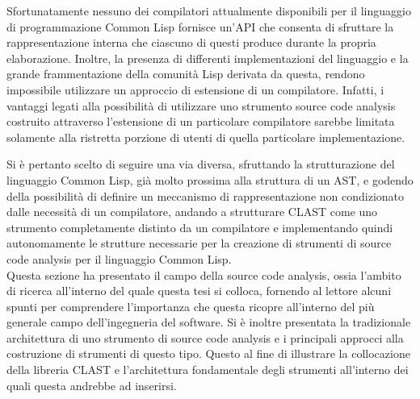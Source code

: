 Sfortunatamente nessuno dei compilatori attualmente disponibili per il
linguaggio di programmazione Common Lisp fornisce un'API che consenta di
sfruttare la rappresentazione interna che ciascuno di questi produce durante la
propria elaborazione. Inoltre, la presenza di differenti implementazioni del
linguaggio e la grande frammentazione della comunità Lisp derivata da questa,
rendono impossibile utilizzare un approccio di estensione di un compilatore.
Infatti, i vantaggi legati alla possibilità di utilizzare uno strumento source
code analysis costruito attraverso l'estensione di un particolare compilatore
sarebbe limitata solamente alla ristretta porzione di utenti di quella
particolare implementazione.

Si è pertanto scelto di seguire una via diversa, sfruttando la strutturazione
del linguaggio Common Lisp, già molto prossima alla struttura di un AST, e
godendo della possibilità di definire un meccanismo di rappresentazione non
condizionato dalle necessità di un compilatore, andando a strutturare CLAST come
uno strumento completamente distinto da un compilatore e implementando quindi
autonomamente le strutture necessarie per la creazione di strumenti di source
code analysis per il linguaggio Common Lisp.\\

Questa sezione ha presentato il campo della source code analysis, ossia l'ambito
di ricerca all'interno del quale questa tesi si colloca, fornendo al lettore
alcuni spunti per comprendere l'importanza che questa ricopre all'interno del
più generale campo dell'ingegneria del software. Si è inoltre presentata la
tradizionale architettura di uno strumento di source code analysis e i
principali approcci alla costruzione di strumenti di questo tipo. Questo al fine
di illustrare la collocazione della libreria CLAST e l'architettura fondamentale degli strumenti all'interno dei quali questa andrebbe ad inserirsi.
